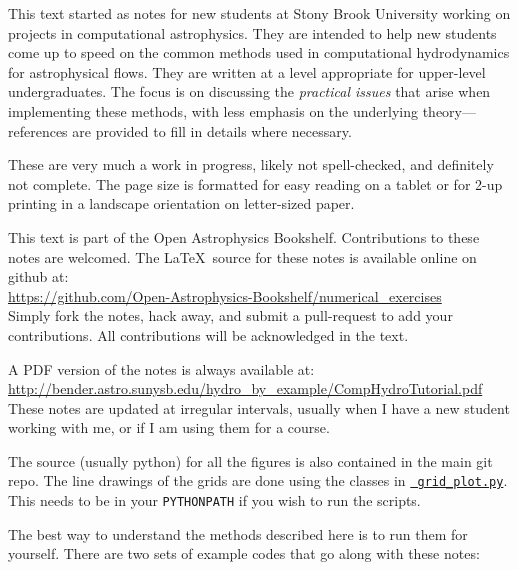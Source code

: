 
This text started as notes for new students at Stony Brook University
working on projects in computational astrophysics.  They are
intended  to help new students come up to speed on the
common methods used in computational hydrodynamics for astrophysical
flows.  They are written at a level appropriate for upper-level
undergraduates.  The focus is on discussing the {\em practical issues}
that arise when implementing these methods, with less emphasis on the
underlying theory---references are provided to fill in details where
necessary.

These are very much a work in progress, likely not spell-checked, and
definitely not complete.  The page size is formatted for easy reading
on a tablet or for 2-up printing in a landscape orientation on
letter-sized paper.  

This text is part of the Open Astrophysics Bookshelf.
Contributions to these notes are welcomed.  The \LaTeX\ source
for these notes is available online on github at: \\[0.25em]
%
\url{https://github.com/Open-Astrophysics-Bookshelf/numerical_exercises} \\[0.25em]
%
Simply fork the notes, hack away, and submit a pull-request to add
your contributions.  All contributions will be acknowledged in the text.


A PDF version of the notes is always available
at: \\[0.25em]
%
\url{http://bender.astro.sunysb.edu/hydro_by_example/CompHydroTutorial.pdf} \\[0.25em]
%
These notes are updated at irregular intervals, usually when I have a
new student working with me, or if I am using them for a course.

The source (usually python) for all the figures is also contained in
the main git repo.  The line drawings of the grids are done using the
classes in
\href{https://github.com/Open-Astrophysics-Bookshelf/numerical_exercises/blob/master/grid_plot.py}{{\tt
    grid\_plot.py}}.  This needs to be in your {\tt PYTHONPATH} if you
wish to run the scripts.

The best way to understand the methods described here is to run
them for yourself.  There are two sets of example codes that
go along with these notes:

